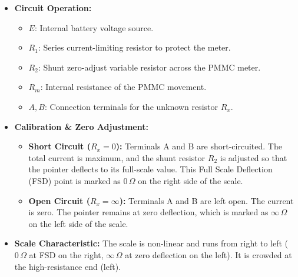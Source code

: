 \documentclass[12pt,a4paper]{article}
\begin{document}
\begin{itemize}[leftmargin=*, itemsep=3.5pt]
  \item \textbf{Circuit Operation:}
    \begin{itemize}[leftmargin=*, itemsep=2.5pt, topsep=0pt]
      \item $E$: Internal battery voltage source.
      \item $R_1$: Series current-limiting resistor to protect the meter.
      \item $R_2$: Shunt zero-adjust variable resistor across the PMMC meter.
      \item $R_m$: Internal resistance of the PMMC movement.
      \item $A, B$: Connection terminals for the unknown resistor $R_x$.
    \end{itemize}
  \item \textbf{Calibration \& Zero Adjustment:}
    \begin{itemize}[leftmargin=*, itemsep=2.5pt, topsep=0pt]
      \item \textbf{Short Circuit ($R_x = 0$):} Terminals A and B are short-circuited. The total current is maximum, and the shunt resistor $R_2$ is adjusted so that the pointer deflects to its full-scale value. This Full Scale Deflection (FSD) point is marked as $0\,\Omega$ on the right side of the scale.
      \item \textbf{Open Circuit ($R_x = \infty$):} Terminals A and B are left open. The current is zero. The pointer remains at zero deflection, which is marked as $\infty\,\Omega$ on the left side of the scale.
    \end{itemize}
  \item \textbf{Scale Characteristic:} The scale is non-linear and runs from right to left ($0\,\Omega$ at FSD on the right, $\infty\,\Omega$ at zero deflection on the left). It is crowded at the high-resistance end (left).
\end{itemize}
\end{document}
